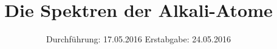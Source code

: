 

\subject{Versuch 605}
\title{Die Spektren der Alkali-Atome}
\date{
  Durchführung: 17.05.2016
  \hspace{3em}
  Erstabgabe: 24.05.2016
}



\maketitle
\thispagestyle{empty}
\tableofcontents
\newpage






\printbibliography


